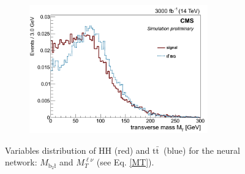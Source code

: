 \documentclass[10pt,a4paper]{article}
\newcommand{\ww}{7.7cm} %
\newcommand{\dd}{-2mm} %
\renewcommand{\tt}{\ensuremath{\text{t}\bar{\text{t}}}}
\begin{document}
\begin{figure}[h]
  \begin{subfigure}[b]{17cm}
      \centering
      \includegraphics[width=\ww]{figs/MT_lnu.png}
  \end{subfigure}	
  \vspace{\dd}
  \caption{Variables distribution of HH (red) and \tt\ (blue) for the neural network: $M_{\text{b}_2\text{\l}}$ and $M_T^{\ell\nu}$ (see Eq. \eqref{MT}).} \label{vars8}

\end{figure}
\end{document}
